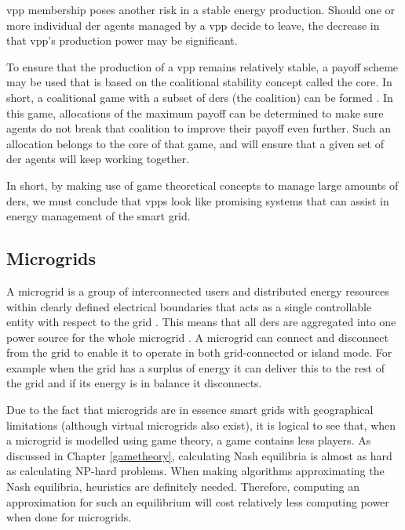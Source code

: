 \ac{vpp} membership poses another risk in a stable energy production. Should one or more individual \ac{der} agents managed by a \ac{vpp} decide to leave, the decrease in that \ac{vpp}'s production power may be significant. 

To ensure that the production of a \ac{vpp} remains relatively stable, a payoff scheme may be used that is based on the coalitional stability concept called the core. In short, a coalitional game with a subset of \acp{der} (the coalition) can be formed \cite{MihailescuVasiraniOssowski2011}. In this game, allocations of the maximum payoff can be determined to make sure agents do not break that coalition to improve their payoff even further\cite{ChalkiadakisRobuKotaEtAl2011, YeungPoonWu1999, SaadHanPoor2011}. Such an allocation belongs to the core of that game, and will ensure that a given set of \ac{der} agents will keep working together.

In short, by making use of game theoretical concepts to manage large amounts of \acp{der}, we must conclude that \acp{vpp} look like promising systems that can assist in energy management of the smart grid. 

\subsection{Microgrids}\label{microgrids}
A microgrid is a group of interconnected users and distributed energy resources within clearly defined electrical boundaries that acts as a single controllable entity with respect to the grid \cite{ParhiziLotfiKhodaeiEtAl2015}. This means that all \acp{der} are aggregated into one power source for the whole microgrid \cite{KanchevLuColasEtAl2011}. A microgrid can connect and disconnect from the grid to enable it to operate in both grid-connected or island mode. For example when the grid has a surplus of energy it can deliver this to the rest of the grid and if its energy is in balance it disconnects. 

Due to the fact that microgrids are in essence smart grids with geographical limitations (although virtual microgrids also exist), it is logical to see that, when a microgrid is modelled using game theory, a game contains less players. As discussed in Chapter \ref{gametheory}, calculating Nash equilibria is almost as hard as calculating NP-hard problems. When making algorithms approximating the Nash equilibria, heuristics are definitely needed. Therefore, computing an approximation for such an equilibrium will cost relatively less computing power when done for microgrids. 

